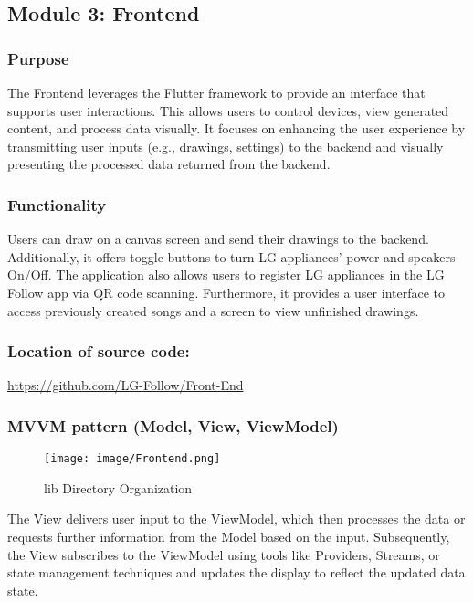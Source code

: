 \documentclass[conference]{IEEEtran}
\begin{document}
\clearpage

\subsection{Module 3: Frontend}

\subsubsection{Purpose}
\noindent The Frontend leverages the Flutter framework to provide an interface that supports user interactions. This allows users to control devices, view generated content, and process data visually. It focuses on enhancing the user experience by transmitting user inputs (e.g., drawings, settings) to the backend and visually presenting the processed data returned from the backend.\\

\subsubsection{Functionality}
\noindent Users can draw on a canvas screen and send their drawings to the backend. Additionally, it offers toggle buttons to turn LG appliances' power and speakers On/Off. The application also allows users to register LG appliances in the LG Follow app via QR code scanning. Furthermore, it provides a user interface to access previously created songs and a screen to view unfinished drawings.\\

\subsubsection{Location of source code:}
\url{https://github.com/LG-Follow/Front-End}\\

\subsubsection{MVVM pattern (Model, View, ViewModel)}

\begin{figure}[h!]
    \centering
    \texttt{[image: image/Frontend.png]}
    \caption{lib Directory Organization}
    \label{fig:enter-label}
\end{figure}
\noindent The View delivers user input to the ViewModel, which then processes the data or requests further information from the Model based on the input. Subsequently, the View subscribes to the ViewModel using tools like Providers, Streams, or state management techniques and updates the display to reflect the updated data state.\\
\end{document}
